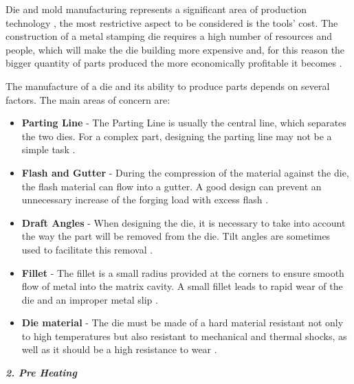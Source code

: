 Die and mold manufacturing represents a significant area of production technology , the most restrictive aspect to be considered is the tools' cost. The construction of a metal stamping die requires a high number of resources and people, which will make the die building more expensive and, for this reason the bigger quantity of parts produced the more economically profitable it becomes \cite{souza2015estudo}.\par
The manufacture of a die and its ability to produce parts depends on several factors. The main areas of concern are:
\begin{itemize}
    \item \textbf{Parting Line} - The Parting Line is usually the central line, which separates the two dies. For a complex part, designing the parting line may not be a simple task \cite{site3,smith1990design}.
    \item \textbf{Flash and Gutter} - During the compression of the material against the die, the flash material can flow into a gutter. A good design can prevent an unnecessary increase of the forging load with excess flash \cite{site3,smith1990design}.
    \item \textbf{Draft Angles} - When designing the die, it is necessary to take into account the way the part will be removed from the die. Tilt angles are sometimes used to facilitate this removal \cite{site3,smith1990design}.
    \item \textbf{Fillet} - The fillet is a small radius provided at the corners to ensure smooth flow of metal into the matrix cavity. A small fillet leads to rapid wear of the die and an improper metal slip \cite{site3,smith1990design}.
    \item \textbf{Die material} - 
The die must be made of a hard material resistant not only to high temperatures but also resistant to mechanical and thermal shocks, as well as it should be a high resistance to wear \cite{site3,smith1990design}.
\end{itemize}



\vspace{50}


\textbf{ \emph{2. Pre Heating}}\\


